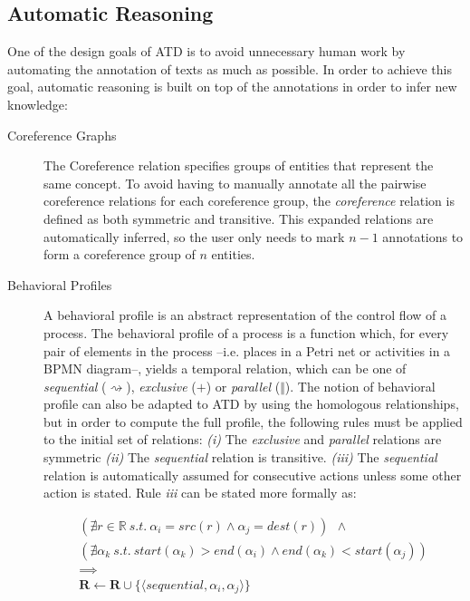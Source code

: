 \subsection{Automatic Reasoning}

\label{sec:atd_reasoning}

One of the design goals of ATD is to avoid unnecessary human work by automating
the annotation of texts as much as possible. In order to achieve this goal,
automatic reasoning is built on top of the annotations in order to infer new
knowledge:


\begin{description}

  \item[Coreference Graphs]{The Coreference relation specifies groups of
      entities that represent the same concept. To avoid having to manually
      annotate all the pairwise coreference relations for each coreference
      group, the \emph{coreference} relation is defined as both symmetric and
      transitive. This expanded relations are automatically inferred, so the
      user only needs to mark $n-1$ annotations to form a coreference group of
      $n$ entities.}
  \item[Behavioral Profiles]{A behavioral profile\cite{smirnov2010business} is
      an abstract representation of the control flow of a process. The
      behavioral profile of a process is a function which, for every pair of
      elements in the process --i.e. places in a Petri net or activities in a
      BPMN diagram--, yields a temporal relation, which can be one of
      \emph{sequential} ($\rightsquigarrow$), \emph{exclusive} ($+$) or
      \emph{parallel} ($\Vert$). The notion of behavioral profile can also be
      adapted to ATD by using the homologous relationships, but in order to
      compute the full profile, the following rules must be applied to the
      initial set of relations: \emph{(i)} The \emph{exclusive} and
      \emph{parallel} relations are symmetric \emph{(ii)} The \emph{sequential}
      relation is transitive. \textit{(iii)} The \emph{sequential} relation is
      automatically assumed for consecutive actions unless some other action is
      stated. Rule \emph{iii} can be stated more formally as:

    \begin{equation*}
      \begin{split}
        (\nexists r \in \mathbb{R} ~s.t.~ \alpha_i = src(r) \land \alpha_j =
        dest(r)) ~~\land~~~~~~~~~~~~~~ \\
        (\nexists \alpha_k ~s.t.~ start(\alpha_k) > end(\alpha_i) \land
        end(\alpha_k) < start(\alpha_j)) \\
        \implies ~~~~~~~~~~~~~~~~~~~~~~~~~~~~~~~~~\\
        \mathbf{R} \leftarrow \mathbf{R} \cup \{\langle sequential, \alpha_i, \alpha_j \rangle\}~~~~~~~~~~~~~~~
      \end{split}
    \end{equation*}

}
\end{description}
